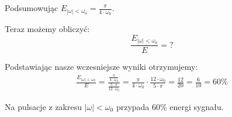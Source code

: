 \begin{task}
Podsumowując $ E_{\left| \omega \right| < \omega_0} = \frac{\pi}{4 \cdot \omega_0}$.

Teraz możemy obliczyć:
\begin{equation}
\frac{E_{\left| \omega \right| < \omega_0}}{E} = ?
\end{equation}

Podstawiając nasze wczesniejsze wyniki otrzymujemy:
\begin{align*}
\frac{E_{\left| \omega \right| < \omega_0}}{E} = \frac{\frac{\pi}{4 \cdot \omega_0}}{\frac{5 \cdot \pi}{12 \cdot \omega_0}} =\frac{\pi}{4 \cdot \omega_0} \cdot \frac{12 \cdot \omega_0}{5 \cdot \pi} =\frac{12}{20} =\frac{6}{10}=60\%
\end{align*}

Na pulsacje z zakresu $\left| \omega \right| < \omega_0$ przypada $60\%$ energi sygnału.

\end{task}

